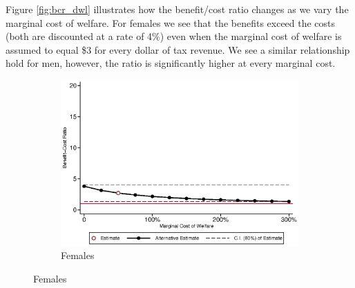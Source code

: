\noindent Figure \ref{fig:bcr_dwl} illustrates how the benefit/cost ratio changes as we vary
the marginal cost of welfare. For females we see that the benefits exceed the costs (both are discounted at a rate of 4\%) even when the marginal cost of welfare is
assumed to equal \$3 for every dollar of tax revenue. We see a similar relationship hold for men, however, the ratio is significantly higher at every marginal cost.

\begin{figure}[H]
\caption{Benefit/cost Ratio vs. Deadweight Loss} \label{fig:bcr_dwl}
	\begin{subfigure}[h]{0.8\textwidth}
	\centering
	\caption{Females} \label{fig:bcr_dwl_f}
	\includegraphics[width=\textwidth]{AppOutput/Sensitivity/bcr_dwl_f1.eps}
	\end{subfigure}
	

\end{figure}
